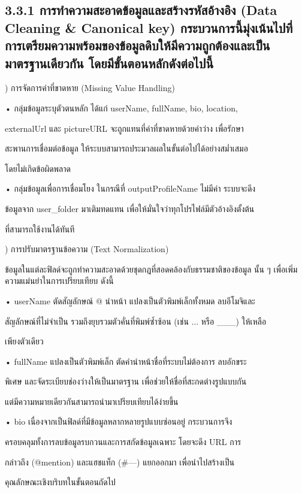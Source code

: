 \documentclass[12pt,a4paper]{report}
\begin{document}
\subsection*{3.3.1 การทำความสะอาดข้อมูลและสร้างรหัสอ้างอิง (Data Cleaning \& Canonical key) กระบวนการนี้มุ่งเน้นไปที่การเตรียมความพร้อมของข้อมูลดิบให้มีความถูกต้องและเป็น มาตรฐานเดียวกัน โดยมีขั้นตอนหลักดังต่อไปนี้}
) การจัดการค่าที่ขาดหาย (Missing Value Handling)\par
\noindent • กลุ่มข้อมูลระบุตัวตนหลัก ได้แก่ userName, fullName, bio, location,\par
externalUrl และ pictureURL จะถูกแทนที่ค่าที่ขาดหายด้วยค่าว่าง เพื่อรักษา\par
สะพานการเชื่อมต่อข้อมูล ให้ระบบสามารถประมวลผลในขั้นต่อไปได้อย่างสม่ำเสมอ\par
โดยไม่เกิดข้อผิดพลาด\par
\noindent • กลุ่มข้อมูลเพื่อการเชื่อมโยง ในกรณีที่ outputProfileName ไม่มีค่า ระบบจะดึง\par
ข้อมูลจาก user\_folder มาเติมทดแทน เพื่อให้มั่นใจว่าทุกโปรไฟล์มีตัวอ้างอิงตั้งต้น\par
ที่สามารถใช้งานได้ทันที\par
{}) การปรับมาตรฐานข้อความ (Text Normalization)\par
ข้อมูลในแต่ละฟิลด์จะถูกทำความสะอาดด้วยชุดกฎที่สอดคล้องกับธรรมชาติของข้อมูล นั้น ๆ เพื่อเพิ่มความแม่นยำในการเปรียบเทียบ ดังนี้\par
\clearpage
\noindent • userName ตัดสัญลักษณ์ @ นำหน้า แปลงเป็นตัวพิมพ์เล็กทั้งหมด ลบอีโมจิและ\par
สัญลักษณ์ที่ไม่จำเป็น รวมถึงยุบรวมตัวคั่นที่พิมพ์ซ้ำซ้อน (เช่น ... หรือ \_\_\_) ให้เหลือ\par
เพียงตัวเดียว\par
\noindent • fullName แปลงเป็นตัวพิมพ์เล็ก ตัดคำนำหน้าชื่อที่ระบบไม่ต้องการ ลบอักขระ\par
พิเศษ และจัดระเบียบช่องว่างให้เป็นมาตรฐาน เพื่อช่วยให้ชื่อที่สะกดต่างรูปแบบกัน\par
แต่มีความหมายเดียวกันสามารถนำมาเปรียบเทียบได้ง่ายขึ้น\par
\noindent • bio เนื่องจากเป็นฟิลด์ที่มีข้อมูลหลากหลายรูปแบบซ่อนอยู่ กระบวนการจึง\par
ครอบคลุมทั้งการลบข้อมูลรบกวนและการสกัดข้อมูลเฉพาะ โดยจะดึง URL การ\par
กล่าวถึง (@mention) และแฮชแท็ก (\#---) แยกออกมา เพื่อนำไปสร้างเป็น\par
คุณลักษณะเชิงบริบทในขั้นตอนถัดไป\par
\end{document}
